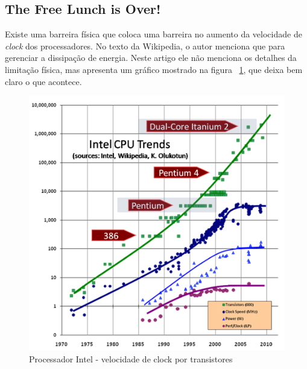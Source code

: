 \documentclass[]{article}
\begin{document}
	\subsection{The Free Lunch is Over!}
		\par Existe uma barreira física que coloca uma barreira no aumento da velocidade de \textit{clock} dos processadores.
		No texto da Wikipedia, o autor menciona que para gerenciar a dissipação de energia. Neste artigo ele não menciona os
		detalhes da limitação física, mas apresenta um gráfico mostrado na figura ~\ref{fig:cpu_chart}, que deixa bem claro
		o que acontece.
		
		\vspace{1ex}
		\begin{figure}[hbtp]
		\centering
		\includegraphics{images/cpu-chart.png}
		\caption{Processador Intel - velocidade de clock por transistores}
		\label{fig:cpu_chart}
		\end{figure}
		
\end{document}
